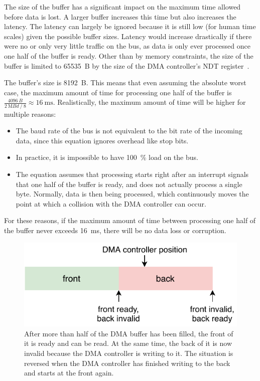 The size of the buffer has a significant impact on the maximum time allowed before data is lost. A
larger buffer increases this time but also increases the latency. The latency can largely be ignored
because it is still low (for human time scales) given the possible buffer sizes. Latency would
increase drastically if there were no or only very little traffic on the bus, as data is only ever
processed once one half of the buffer is ready. Other than by memory constraints, the size of the buffer
is limited to \SI{65535}{B} by the size of the DMA controller's NDT register~\cite{mcu-ref-manual}.

The buffer's size is \SI{8192}{B}. This means that even assuming the absolute worst case, the maximum
amount of time for processing one half of the buffer is
$\frac{\SI{4096}{B}}{\SI{2}{\mega{Bd}} \mathbin{/} 8} \approx \SI{16}{\milli\second}$. Realistically,
the maximum amount of time will be higher for multiple reasons:

\begin{itemize}
    \item The baud rate of the bus is not equivalent to the bit rate of the incoming data, since
          this equation ignores overhead like stop bits.
    \item In practice, it is impossible to have \SI{100}{\percent} load on the bus.
    \item The equation assumes that processing starts right after an interrupt signals that one half
          of the buffer is ready, and does not actually process a single byte. Normally, data is
          then being processed, which continuously moves the point at which a collision with the DMA
          controller can occur.
\end{itemize}

For these reasons, if the maximum amount of time between processing one half of the buffer never
exceeds \SI{16}{\milli\second}, there will be no data loss or corruption.

\begin{figure}[h]
    \centering
    \includegraphics[scale=1.0]{img/dma_buffer.pdf}
    \caption[Layout of the DMA buffer]{
        After more than half of the DMA buffer has been filled, the front of it is ready and can be
        read. At the same time, the back of it is now invalid because the DMA controller is writing
        to it. The situation is reversed when the DMA controller has finished writing to the back
        and starts at the front again.
    }
\end{figure}

